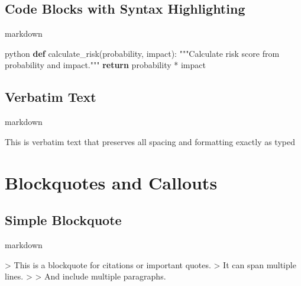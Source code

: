 \documentclass[
  11pt,
  letterpaper,
]{book}
\newenvironment{Shaded}{\begin{snugshade}}{\end{snugshade}}
\newcommand{\AttributeTok}[1]{\textcolor[rgb]{0.40,0.45,0.13}{#1}}
\newcommand{\CommentTok}[1]{\textcolor[rgb]{0.37,0.37,0.37}{#1}}
\newcommand{\ControlFlowTok}[1]{\textcolor[rgb]{0.00,0.23,0.31}{\textbf{#1}}}
\newcommand{\InformationTok}[1]{\textcolor[rgb]{0.37,0.37,0.37}{#1}}
\newcommand{\KeywordTok}[1]{\textcolor[rgb]{0.00,0.23,0.31}{\textbf{#1}}}
\newcommand{\NormalTok}[1]{\textcolor[rgb]{0.00,0.23,0.31}{#1}}
\newcommand{\OperatorTok}[1]{\textcolor[rgb]{0.37,0.37,0.37}{#1}}
\begin{document}
\subsection*{Code Blocks with Syntax
Highlighting}\label{code-blocks-with-syntax-highlighting}

markdown

\begin{Shaded}
\begin{Highlighting}[]
\InformationTok{\textasciigrave{}\textasciigrave{}\textasciigrave{}python}
\KeywordTok{def}\NormalTok{ calculate\_risk(probability, impact):}
    \CommentTok{"""Calculate risk score from probability and impact."""}
    \ControlFlowTok{return}\NormalTok{ probability }\OperatorTok{*}\NormalTok{ impact}
\InformationTok{\textasciigrave{}\textasciigrave{}\textasciigrave{}}
\end{Highlighting}
\end{Shaded}

\subsection*{Verbatim Text}\label{verbatim-text}

markdown

This is verbatim text that preserves all spacing and formatting exactly
as typed

\section*{Blockquotes and Callouts}\label{blockquotes-and-callouts}


\subsection*{Simple Blockquote}\label{simple-blockquote}

markdown

\begin{Shaded}
\begin{Highlighting}[]
\AttributeTok{\textgreater{} This is a blockquote for citations or important quotes.}
\AttributeTok{\textgreater{} It can span multiple lines.}
\AttributeTok{\textgreater{}}
\AttributeTok{\textgreater{} And include multiple paragraphs.}
\end{Highlighting}
\end{Shaded}
\end{document}
